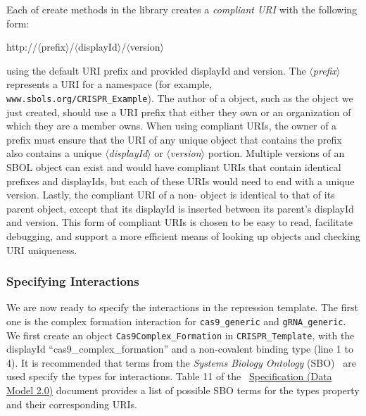 Each of create methods in the library creates a \emph{compliant URI} with the following form:
\begin{center}
http://$\langle$prefix$\rangle$/$\langle$displayId$\rangle$/$\langle$version$\rangle$
\end{center}
using the default URI prefix and provided displayId and version. The \emph{$\langle$prefix$\rangle$} represents a URI for a namespace (for example, {\tt www.sbols.org/CRISPR\_Example}). The author of a  object, such as the  object we just created, should use a URI prefix that either they own or an organization of which they are a member owns. When using compliant URIs, the owner of a prefix must ensure that the URI of any unique  object that contains the prefix also contains a unique  \emph{$\langle$displayId$\rangle$} or \emph{$\langle$version$\rangle$} portion. Multiple versions of an SBOL object can exist and would have compliant URIs that contain identical prefixes and displayIds, but each of these URIs would need to end with a unique version. Lastly, the compliant URI of a non- object is identical to that of its parent object, except that its displayId is inserted between its parent's displayId and version. This form of compliant URIs is chosen to be easy to read, facilitate debugging, and support a more efficient means of looking up objects and checking URI uniqueness. 

\subsubsection*{Specifying Interactions}
We are now ready to specify the interactions in the repression template. The first one is the complex formation interaction for \lstinline+cas9_generic+ and \lstinline+gRNA_generic+. We first create an  object \lstinline+Cas9Complex_Formation+ in \lstinline+CRISPR_Template+, with the displayId ``cas9\_complex\_formation'' and a non-covalent binding type (line 1 to 4). It is recommended that terms from the \emph{Systems Biology Ontology} (SBO)~\cite{Courtot2011} are used specify the types for interactions. Table 11 of the ~\href{http://sbolstandard.org/downloads/specification-data-model-2-0/}{Specification  (Data Model 2.0)} document provides a list of possible SBO terms for the types property and their corresponding URIs. 

